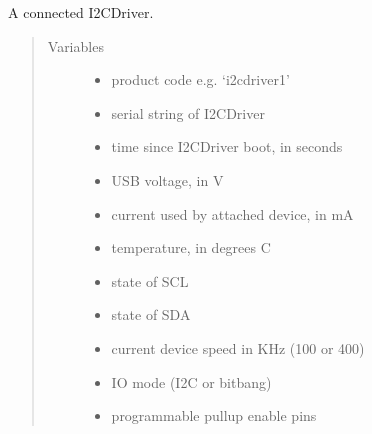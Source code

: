 
\begin{fulllineitems}
\label{\detokenize{index:i2cdriver.I2CDriver}}
A connected I2CDriver.
\begin{quote}\begin{description}
\item[{Variables}] \leavevmode\begin{itemize}
\item {} 
 \textendash{} product code e.g. ‘i2cdriver1’

\item {} 
 \textendash{} serial string of I2CDriver

\item {} 
 \textendash{} time since I2CDriver boot, in seconds

\item {} 
 \textendash{} USB voltage, in V

\item {} 
 \textendash{} current used by attached device, in mA

\item {} 
 \textendash{} temperature, in degrees C

\item {} 
 \textendash{} state of SCL

\item {} 
 \textendash{} state of SDA

\item {} 
 \textendash{} current device speed in KHz (100 or 400)

\item {} 
 \textendash{} IO mode (I2C or bitbang)

\item {} 
 \textendash{} programmable pullup enable pins


\end{itemize}
\end{description}
\end{quote}
\end{fulllineitems}
